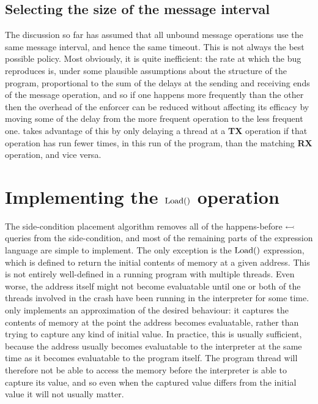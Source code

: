 \subsection{Selecting the size of the message interval}
\label{sect:using:timeout_balancing}


The discussion so far has assumed that all unbound message operations
use the same message interval, and hence the same timeout.  This is
not always the best possible policy.  Most obviously, it is quite
inefficient: the rate at which the bug reproduces is, under some
plausible assumptions about the structure of the program, proportional
to the sum of the delays at the sending and receiving ends of the
message operation, and so if one happens more frequently than the
other then the overhead of the enforcer can be reduced without
affecting its efficacy by moving some of the delay from the more
frequent operation to the less frequent one.  {\Implementation} takes
advantage of this by only delaying a thread at a \textbf{TX} operation
if that operation has run fewer times, in this run of the program,
than the matching \textbf{RX} operation, and vice versa.

\section{Implementing the $\mathrm{Load}()$ operation}

The side-condition placement algorithm removes
all of the happens-before $\leftarrowtail$ queries from the
side-condition, and most of the remaining parts of the {\StateMachine}
expression language are simple to implement.  The only exception is
the $\mathrm{Load}()$ expression, which is defined to return the initial
contents of memory at a given address.  This is not entirely
well-defined in a running program with multiple threads.  Even worse,
the address itself might not become evaluatable until one or both of
the threads involved in the crash have been running in the interpreter
for some time.  {\Implementation} only implements an approximation of
the desired behaviour: it captures the contents of memory at the point
the address becomes evaluatable, rather than trying to capture any
kind of initial value.  In practice, this is usually sufficient,
because the address usually becomes evaluatable to the interpreter at
the same time as it becomes evaluatable to the program itself.  The
program thread will therefore not be able to access the memory before
the interpreter is able to capture its value, and so even when the
captured value differs from the initial value it will not usually
matter.

